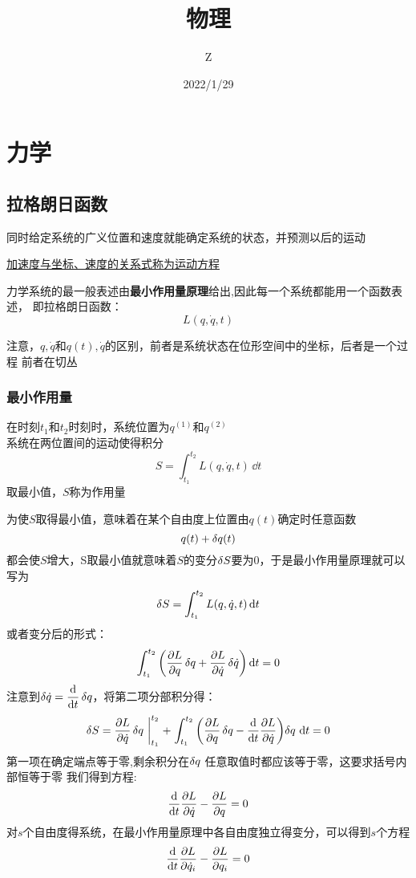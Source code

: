 \documentclass[12pt]{report}
\newcommand{\dotq}{\dot{q}}
\newcommand{\Lagfunc}{L(q,\dot{q},t)}
\newcommand{\Lageq}{\dv{t}\pdv{L}{\dotq _i}-\pdv{L}{q_i} =0}
\begin{document}
    \title{物理}
    \date{2022/1/29}
    \author{Z}
    \maketitle
    \tableofcontents{}
\chapter{力学}
\section{拉格朗日函数}
同时给定系统的广义位置和速度就能确定系统的状态，并预测以后的运动
\par\underline{加速度与坐标、速度的关系式称为运动方程}\par
力学系统的最一般表述由\textbf{最小作用量原理}给出,因此每一个系统都能用一个函数表述，
即拉格朗日函数：
$$\Lagfunc$$

注意，$q,\dot{q}$和$q(t),\dot{q}$的区别，前者是系统状态在位形空间中的坐标，后者是一个过程
前者在切丛
\subsection{最小作用量}
在时刻$t_1$和$t_2$时刻时，系统位置为$q^{(1)}$和$q^{(2)}$\\
系统在两位置间的运动使得积分
\begin{equation}
    S =\int_{t_1}^{t_2} L(q,\dot{q},t) \,\dd t
    \label{作用量}
\end{equation}
取最小值，$S$称为作用量\par
为使$S$取得最小值，意味着在某个自由度上位置由$q(t)$确定时任意函数
$$q(t)+\var{q(t)}$$
都会使$S$增大，S取最小值就意味着$S$的变分$\var{S}$要为0，于是最小作用量原理就可以写为
$$\var{S} = \int_{t_1}^{t_2} L(q,\dot{q},t) \,\dd t$$
或者变分后的形式：
$$\int_{t_1}^{t_2} 
\left(\pdv{L}{q}\var{q}
 +\pdv{L}{\dot{q}}\var{\dot{q}}\right) \dd t =0$$ 
注意到$\var{\dot{q}}=\displaystyle{\dv{t}}\var{q}$，将第二项分部积分得：
$$\var{S}=\pdv{L}{\dot{q}}\var{q}\,\bigg|_{t_1}^{t_2}
\mathrel{+}\int_{t_1}^{t_2} \left( \pdv{L}{q}\var{q}
 -\dv{t}\pdv{L}{\dot{q}}\right)\!\var{q}\,\dd t =0$$
第一项在确定端点等于零,剩余积分在$\var{q}$ 任意取值时都应该等于零，这要求括号内部恒等于零
我们得到方程:
\begin{equation}
    \dv{t}\pdv{L}{\dot{q}}-\pdv{L}{q} =0 \label{lagrange方程单自由度}
\end{equation}
对$s$个自由度得系统，在最小作用量原理中各自由度独立得变分，可以得到$s$个方程
\begin{equation}
    \Lageq \label{lagrange方程s自由度}
\end{equation}
\end{document}
